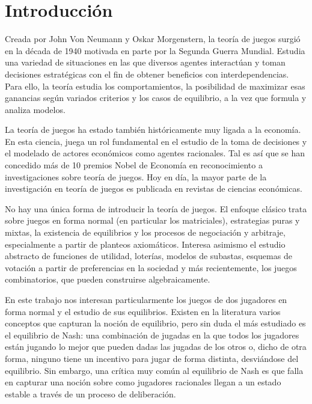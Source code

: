 \chapter{Introducción} \label{cap:intro}

Creada por John Von Neumann y Oskar Morgenstern, la teoría de juegos surgió en la década de 1940 motivada en parte por la Segunda Guerra Mundial. Estudia una variedad de situaciones en las que diversos agentes interactúan y toman decisiones estratégicas con el fin de obtener beneficios con interdependencias. Para ello, la teoría estudia los comportamientos, la posibilidad de maximizar esas ganancias según variados criterios y los casos de equilibrio, a la vez que formula y analiza modelos.

La teoría de juegos ha estado también históricamente muy ligada a la economía. En esta ciencia, juega un rol fundamental en el estudio de la toma de decisiones y el modelado de actores económicos como agentes racionales. Tal es así que se han concedido más de 10 premios Nobel de Economía en reconocimiento a investigaciones sobre teoría de juegos. Hoy en día, la mayor parte de la investigación en teoría de juegos es publicada en revistas de ciencias económicas.

No hay una única forma de introducir la teoría de juegos. El enfoque clásico trata sobre juegos en forma normal (en particular los matriciales), estrategias puras y mixtas, la existencia de equilibrios y los procesos de negociación y arbitraje, especialmente a partir de planteos axiomáticos. Interesa asimismo el estudio abstracto de funciones de utilidad, loterías, modelos de subastas, esquemas de votación a partir de preferencias en la sociedad y más recientemente, los juegos combinatorios, que pueden construirse algebraicamente.

En este trabajo nos interesan particularmente los juegos de dos jugadores en forma normal y el estudio de sus equilibrios. Existen en la literatura varios conceptos que capturan la noción de equilibrio, pero sin duda el más estudiado es el equilibrio de Nash: una combinación de jugadas en la que todos los jugadores están jugando lo mejor que pueden dadas las jugadas de los otros o, dicho de otra forma, ninguno tiene un incentivo para jugar de forma distinta, desviándose del equilibrio. Sin embargo, una crítica muy común al equilibrio de Nash es que falla en capturar una noción sobre como jugadores racionales llegan a un estado estable a través de un proceso de deliberación.


